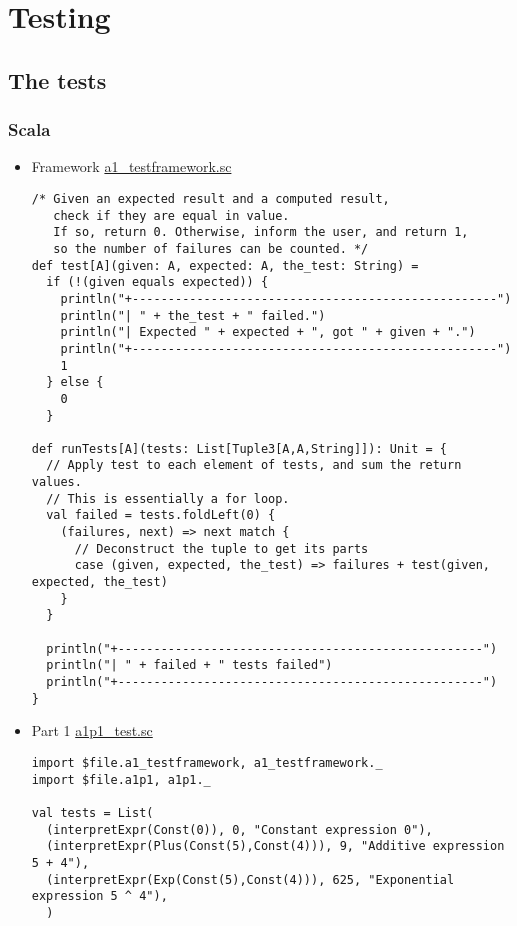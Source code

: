 \documentclass[11pt]{article}
\begin{document}
\section*{Testing}
\label{sec:org0532919}
\subsection*{The tests}
\label{sec:org956b193}
\subsubsection*{Scala}
\label{sec:org4eaf930}
\begin{itemize}
\item Framework
\label{sec:org6fd1a3e}
\href{./testing/a1/a1\_testframework.sc}{a1\_testframework.sc}
\begin{verbatim}
/* Given an expected result and a computed result,
   check if they are equal in value.
   If so, return 0. Otherwise, inform the user, and return 1,
   so the number of failures can be counted. */
def test[A](given: A, expected: A, the_test: String) =
  if (!(given equals expected)) {
    println("+---------------------------------------------------")
    println("| " + the_test + " failed.")
    println("| Expected " + expected + ", got " + given + ".")
    println("+---------------------------------------------------")
    1
  } else {
    0
  }

def runTests[A](tests: List[Tuple3[A,A,String]]): Unit = {
  // Apply test to each element of tests, and sum the return values.
  // This is essentially a for loop.
  val failed = tests.foldLeft(0) {
    (failures, next) => next match {
      // Deconstruct the tuple to get its parts
      case (given, expected, the_test) => failures + test(given, expected, the_test)
    }
  }
  
  println("+---------------------------------------------------")
  println("| " + failed + " tests failed")
  println("+---------------------------------------------------")
}
\end{verbatim}

\item Part 1
\label{sec:org596d732}
\href{./testing/a1/a1p1\_test.sc}{a1p1\_test.sc}
\begin{verbatim}
import $file.a1_testframework, a1_testframework._
import $file.a1p1, a1p1._

val tests = List(
  (interpretExpr(Const(0)), 0, "Constant expression 0"),
  (interpretExpr(Plus(Const(5),Const(4))), 9, "Additive expression 5 + 4"),
  (interpretExpr(Exp(Const(5),Const(4))), 625, "Exponential expression 5 ^ 4"),
  )


\end{verbatim}
\end{itemize}
\end{document}

